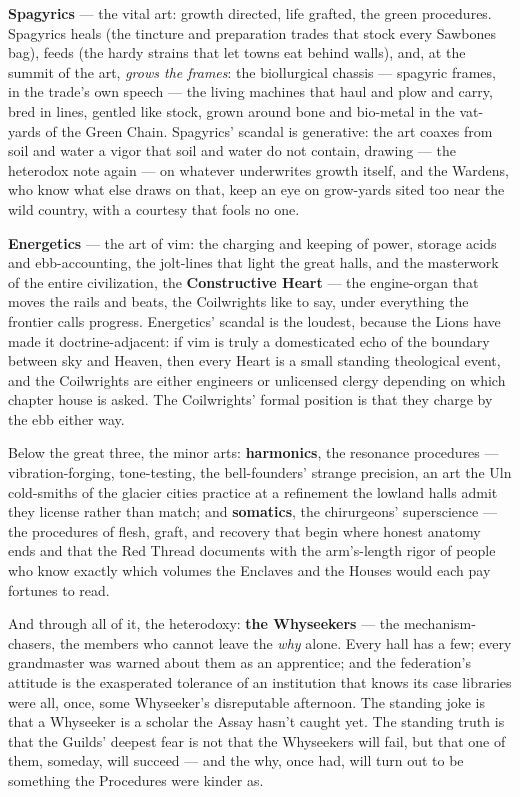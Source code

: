 \textbf{Spagyrics} --- the vital art: growth directed, life grafted, the green procedures. Spagyrics heals (the tincture and preparation trades that stock every Sawbones bag), feeds (the hardy strains that let towns eat behind walls), and, at the summit of the art, \textit{grows the frames}: the biollurgical chassis --- spagyric frames, in the trade's own speech --- the living machines that haul and plow and carry, bred in lines, gentled like stock, grown around bone and bio-metal in the vat-yards of the Green Chain. Spagyrics' scandal is generative: the art coaxes from soil and water a vigor that soil and water do not contain, drawing --- the heterodox note again --- on whatever underwrites growth itself, and the Wardens, who know what else draws on that, keep an eye on grow-yards sited too near the wild country, with a courtesy that fools no one.

\textbf{Energetics} --- the art of vim: the charging and keeping of power, storage acids and ebb-accounting, the jolt-lines that light the great halls, and the masterwork of the entire civilization, the \textbf{Constructive Heart} --- the engine-organ that moves the rails and beats, the Coilwrights like to say, under everything the frontier calls progress. Energetics' scandal is the loudest, because the Lions have made it doctrine-adjacent: if vim is truly a domesticated echo of the boundary between sky and Heaven, then every Heart is a small standing theological event, and the Coilwrights are either engineers or unlicensed clergy depending on which chapter house is asked. The Coilwrights' formal position is that they charge by the ebb either way.

Below the great three, the minor arts: \textbf{harmonics}, the resonance procedures --- vibration-forging, tone-testing, the bell-founders' strange precision, an art the Uln cold-smiths of the glacier cities practice at a refinement the lowland halls admit they license rather than match; and \textbf{somatics}, the chirurgeons' superscience --- the procedures of flesh, graft, and recovery that begin where honest anatomy ends and that the Red Thread documents with the arm's-length rigor of people who know exactly which volumes the Enclaves and the Houses would each pay fortunes to read.

And through all of it, the heterodoxy: \textbf{the Whyseekers} --- the mechanism-chasers, the members who cannot leave the \textit{why} alone. Every hall has a few; every grandmaster was warned about them as an apprentice; and the federation's attitude is the exasperated tolerance of an institution that knows its case libraries were all, once, some Whyseeker's disreputable afternoon. The standing joke is that a Whyseeker is a scholar the Assay hasn't caught yet. The standing truth is that the Guilds' deepest fear is not that the Whyseekers will fail, but that one of them, someday, will succeed --- and the why, once had, will turn out to be something the Procedures were kinder as.

